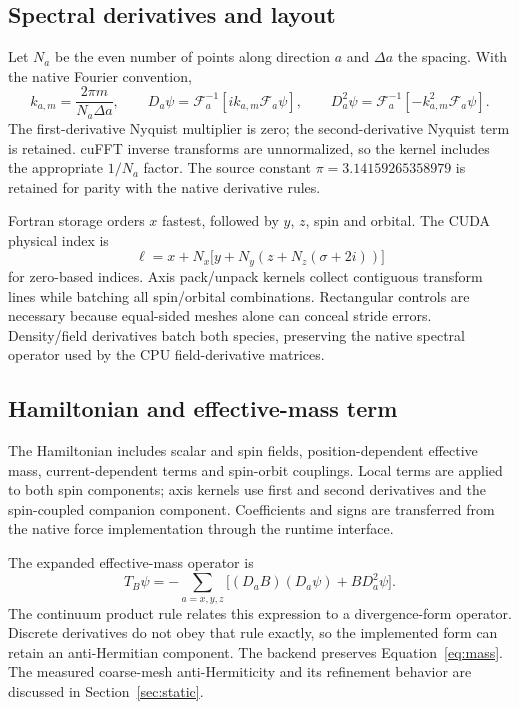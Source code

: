 \documentclass[11pt,a4paper]{article}
\begin{document}
\subsection{Spectral derivatives and layout}
Let $N_a$ be the even number of points along direction $a$ and $\Delta a$ the
spacing. With the native Fourier convention,
\begin{equation}
 k_{a,m}=\frac{2\pi m}{N_a\Delta a},\qquad
 D_a\psi=\mathcal F_a^{-1}[ik_{a,m}\mathcal F_a\psi],\qquad
 D_a^2\psi=\mathcal F_a^{-1}[-k_{a,m}^2\mathcal F_a\psi].
\end{equation}
The first-derivative Nyquist multiplier is zero; the second-derivative
Nyquist term is retained. cuFFT inverse transforms are unnormalized, so the
kernel includes the appropriate $1/N_a$ factor. The source constant
$\pi=3.14159265358979$ is retained for parity with the native derivative
rules.

Fortran storage orders $x$ fastest, followed by $y$, $z$, spin and orbital.
The CUDA physical index is
\begin{equation}
 \ell=x+N_x\bigl[y+N_y(z+N_z(\sigma+2i))\bigr]
\end{equation}
for zero-based indices. Axis pack/unpack kernels collect contiguous transform
lines while batching all spin/orbital combinations. Rectangular controls are
necessary because equal-sided meshes alone can conceal stride errors.
Density/field derivatives batch both species, preserving the native
spectral operator used by the CPU field-derivative matrices.

\subsection{Hamiltonian and effective-mass term}
The Hamiltonian includes scalar and spin fields, position-dependent effective
mass, current-dependent terms and spin-orbit couplings. Local terms are
applied to both spin components; axis kernels use first and second
derivatives and the spin-coupled companion component. Coefficients and signs
are transferred from the native force implementation through the runtime
interface.

The expanded effective-mass operator is
\begin{equation}
 T_B\psi=-\sum_{a=x,y,z}\bigl[(D_a B)(D_a\psi)+B D_a^2\psi\bigr].
 \label{eq:mass}
\end{equation}
The continuum product rule relates this expression to a divergence-form
operator. Discrete derivatives do not obey that rule exactly, so the
implemented form can retain an anti-Hermitian component. The backend
preserves Equation~\eqref{eq:mass}. The measured
coarse-mesh anti-Hermiticity and its refinement behavior are discussed in
Section~\ref{sec:static}.
\end{document}
